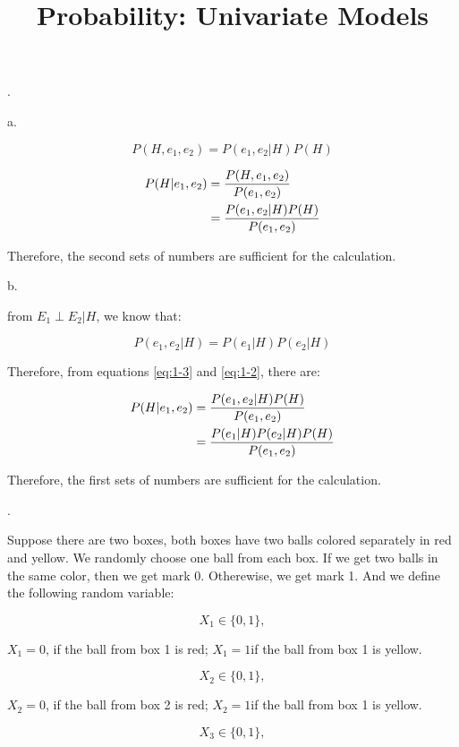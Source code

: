 \documentclass[UTF8]{article}
\title{Probability: Univariate Models}
\date{}
\begin{document}
\maketitle

.

\noindent a.

\begin{equation}
    P(H, e_1, e_2) = P(e_1, e_2 | H)P(H)\label{eq:1-1}
\end{equation}
 

\begin{align}
    P(H | e_1, e_2) &= \frac{P(H, e_1, e_2)}{P(e_1, e_2)}\notag\\
                    &= \frac{P(e_1, e_2 | H)P(H)}{P(e_1, e_2)}\label{eq:1-2}
\end{align}

Therefore, the second sets of numbers are sufficient for the calculation.

\noindent b.

from $E_1\perp E_2 | H$, we know that:

\begin{equation}
    P(e_1, e_2| H) = P(e_1|H)P(e_2|H)\label{eq:1-3}
\end{equation}

Therefore, from equations \ref{eq:1-3} and \ref{eq:1-2}, there are:

\begin{align}
    P(H | e_1, e_2) &= \frac{P(e_1, e_2 | H)P(H)}{P(e_1, e_2)}\notag\\
                    &= \frac{P(e_1|H)P(e_2|H)P(H)}{P(e_1, e_2)}
\end{align}

Therefore, the first sets of numbers are sufficient for the calculation.

.

Suppose there are two boxes, both boxes have two balls colored separately in red
and yellow. We randomly choose one ball from each box. If we get two balls in the same color,
then we get mark 0. Otherewise, we get mark 1. And we define the following random variable:

$$X_1\in\{0, 1\}, $$

$X_1 = 0$, if the ball from box 1 is red; $X_1 = 1$if the ball from box 1 is yellow.

$$X_2\in\{0, 1\}, $$

$X_2 = 0$, if the ball from box 2 is red; $X_2 = 1$if the ball from box 1 is yellow.

$$X_3\in\{0, 1\}, $$
\end{document}
